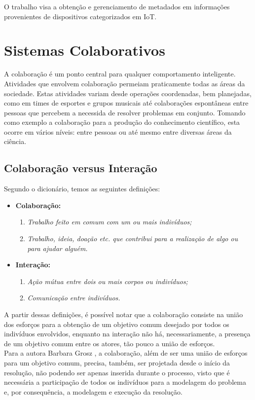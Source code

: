 O trabalho visa a obtenção e gerenciamento de metadados em informações provenientes de
dispositivos categorizados em \acrfull{IoT}. %

\section{Sistemas Colaborativos}
\qqad A colaboração é um ponto central para qualquer comportamento inteligente.
Atividades que envolvem colaboração permeiam praticamente todas as áreas da sociedade. Estas atividades variam desde operações coordenadas,
bem planejadas, como em times de esportes e grupos musicais até colaborações espontâneas
entre pessoas que percebem a necessida de resolver problemas em conjunto.
Tomando como exemplo a colaboração para a produção do conhecimento científico, esta ocorre em vários níveis: entre pessoas ou até mesmo entre diversas áreas da ciência.
 \cite{cbarbara}
\subsection{Colaboração versus Interação}
Segundo o dicionário, temos as seguintes definições:%
\begin{itemize}
  \item \textbf{Colaboração:}
  \begin{enumerate}
    \item \textit{Trabalho feito em comum com um ou mais indivíduos;}
    \item \textit{Trabalho, ideia, doação etc. que contribui para a realização de algo ou para ajudar alguém.}
  \end{enumerate}
  \item \textbf{Interação:}
  \begin{enumerate}
    \item \textit{Ação mútua entre dois ou mais corpos ou indivíduos;}
    \item \textit{Comunicação entre indivíduos.}
  \end{enumerate}
\end{itemize}
 \null
\quad A partir dessas definições, é possível notar que a colaboração consiste na união dos esforços
para a obtenção de um objetivo comum desejado por todos os indivíduos envolvidos, enquanto na interação
não há, necessariamente, a presença de um objetivo comum entre os atores, tão pouco a união de esforços. \\ \null \quad
Para a autora Barbara Grosz \cite{cbarbara}, a colaboração, além de ser uma união de esforços para um objetivo comum,
precisa, também, ser projetada desde o início da resolução, não podendo ser apenas inserida durante o processo, visto que é
necessária a participação de todos os indivíduos para a modelagem do problema e, por consequência, a modelagem e execução da resolução.


